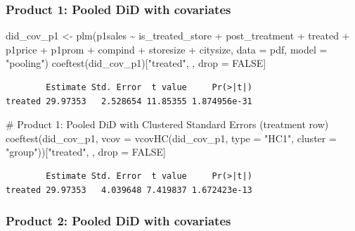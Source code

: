 \documentclass[
  letterpaper,
  DIV=11,
  numbers=noendperiod]{scrartcl}
\newenvironment{Shaded}{\begin{snugshade}}{\end{snugshade}}
\newcommand{\AttributeTok}[1]{\textcolor[rgb]{0.40,0.45,0.13}{#1}}
\newcommand{\CommentTok}[1]{\textcolor[rgb]{0.37,0.37,0.37}{#1}}
\newcommand{\ConstantTok}[1]{\textcolor[rgb]{0.56,0.35,0.01}{#1}}
\newcommand{\FunctionTok}[1]{\textcolor[rgb]{0.28,0.35,0.67}{#1}}
\newcommand{\NormalTok}[1]{\textcolor[rgb]{0.00,0.23,0.31}{#1}}
\newcommand{\OtherTok}[1]{\textcolor[rgb]{0.00,0.23,0.31}{#1}}
\newcommand{\SpecialCharTok}[1]{\textcolor[rgb]{0.37,0.37,0.37}{#1}}
\newcommand{\StringTok}[1]{\textcolor[rgb]{0.13,0.47,0.30}{#1}}
\begin{document}
\subsubsection{Product 1: Pooled DiD with
covariates}\label{product-1-pooled-did-with-covariates}

\begin{Shaded}
\begin{Highlighting}[]
\NormalTok{did\_cov\_p1 }\OtherTok{\textless{}{-}} \FunctionTok{plm}\NormalTok{(p1sales }\SpecialCharTok{\textasciitilde{}}\NormalTok{ is\_treated\_store }\SpecialCharTok{+}\NormalTok{ post\_treatment }\SpecialCharTok{+}\NormalTok{ treated }\SpecialCharTok{+}
\NormalTok{                            p1price }\SpecialCharTok{+}\NormalTok{ p1prom }\SpecialCharTok{+}\NormalTok{ compind }\SpecialCharTok{+}\NormalTok{ storesize }\SpecialCharTok{+}\NormalTok{ citysize,}
                  \AttributeTok{data =}\NormalTok{ pdf,}
                  \AttributeTok{model =} \StringTok{"pooling"}\NormalTok{)}
\FunctionTok{coeftest}\NormalTok{(did\_cov\_p1)[}\StringTok{"treated"}\NormalTok{, , drop }\OtherTok{=} \ConstantTok{FALSE}\NormalTok{]}
\end{Highlighting}
\end{Shaded}

\begin{verbatim}
        Estimate Std. Error  t value     Pr(>|t|)
treated 29.97353   2.528654 11.85355 1.874956e-31
\end{verbatim}

\begin{Shaded}
\begin{Highlighting}[]
\CommentTok{\# Product 1: Pooled DiD with Clustered Standard Errors (treatment row)}
\FunctionTok{coeftest}\NormalTok{(did\_cov\_p1,}
         \AttributeTok{vcov =} \FunctionTok{vcovHC}\NormalTok{(did\_cov\_p1,}
         \AttributeTok{type =} \StringTok{"HC1"}\NormalTok{, }
         \AttributeTok{cluster =} \StringTok{"group"}\NormalTok{))[}\StringTok{"treated"}\NormalTok{, , drop }\OtherTok{=} \ConstantTok{FALSE}\NormalTok{]}
\end{Highlighting}
\end{Shaded}

\begin{verbatim}
        Estimate Std. Error  t value     Pr(>|t|)
treated 29.97353   4.039648 7.419837 1.672423e-13
\end{verbatim}

\subsubsection{Product 2: Pooled DiD with
covariates}\label{product-2-pooled-did-with-covariates}
\end{document}
